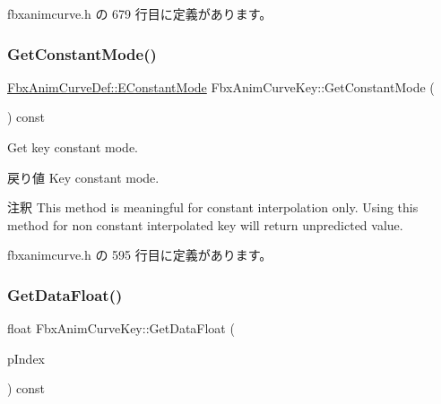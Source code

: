  fbxanimcurve.\+h の 679 行目に定義があります。

\mbox{\label{class_fbx_anim_curve_key_ade9ff492dbe914f25b6a0404d0121a83}} 
\subsubsection{\texorpdfstring{Get\+Constant\+Mode()}{GetConstantMode()}}
{\footnotesize\ttfamily \hyperlink{class_fbx_anim_curve_def_a52885abd392ac8ac3da94bafc5fddd64}{Fbx\+Anim\+Curve\+Def\+::\+E\+Constant\+Mode} Fbx\+Anim\+Curve\+Key\+::\+Get\+Constant\+Mode (\begin{DoxyParamCaption}{ }\end{DoxyParamCaption}) const\hspace{0.3cm}{\ttfamily [inline]}}

Get key constant mode. \begin{DoxyReturn}{戻り値}
Key constant mode. 
\end{DoxyReturn}
\begin{DoxyRemark}{注釈}
This method is meaningful for constant interpolation only. Using this method for non constant interpolated key will return unpredicted value. 
\end{DoxyRemark}


 fbxanimcurve.\+h の 595 行目に定義があります。

\mbox{\label{class_fbx_anim_curve_key_a3185c35241a072105f14327afd275452}} 
\subsubsection{\texorpdfstring{Get\+Data\+Float()}{GetDataFloat()}}
{\footnotesize\ttfamily float Fbx\+Anim\+Curve\+Key\+::\+Get\+Data\+Float (\begin{DoxyParamCaption}\item[{\hyperlink{class_fbx_anim_curve_def_a3be261d961f8226235529b148cf80300}{Fbx\+Anim\+Curve\+Def\+::\+E\+Data\+Index}}]{p\+Index }\end{DoxyParamCaption}) const\hspace{0.3cm}{\ttfamily [inline]}}

